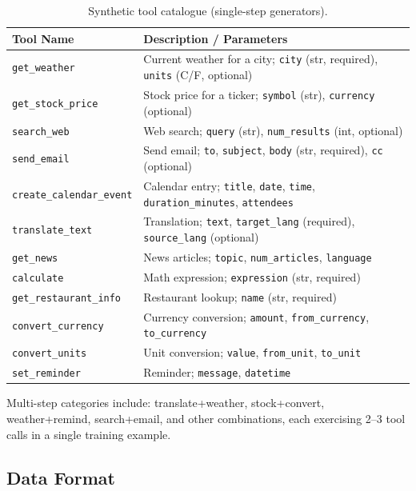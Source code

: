 \documentclass[12pt, a4paper]{article}
\newcommand{\thead}[1]{\textbf{#1}}
\begin{document}
\begin{table}[H]
\centering
\caption{Synthetic tool catalogue (single-step generators).}
\label{tab:tools}
\begin{tabularx}{\linewidth}{L{4.2cm} L{9.8cm}}
\toprule
\thead{Tool Name} & \thead{Description / Parameters} \\
\midrule
\texttt{get\_weather} & Current weather for a city; \texttt{city} (str, required), \texttt{units} (C/F, optional) \\
\texttt{get\_stock\_price} & Stock price for a ticker; \texttt{symbol} (str), \texttt{currency} (optional) \\
\texttt{search\_web} & Web search; \texttt{query} (str), \texttt{num\_results} (int, optional) \\
\texttt{send\_email} & Send email; \texttt{to}, \texttt{subject}, \texttt{body} (str, required), \texttt{cc} (optional) \\
\texttt{create\_calendar\_event} & Calendar entry; \texttt{title}, \texttt{date}, \texttt{time}, \texttt{duration\_minutes}, \texttt{attendees} \\
\texttt{translate\_text} & Translation; \texttt{text}, \texttt{target\_lang} (required), \texttt{source\_lang} (optional) \\
\texttt{get\_news} & News articles; \texttt{topic}, \texttt{num\_articles}, \texttt{language} \\
\texttt{calculate} & Math expression; \texttt{expression} (str, required) \\
\texttt{get\_restaurant\_info} & Restaurant lookup; \texttt{name} (str, required) \\
\texttt{convert\_currency} & Currency conversion; \texttt{amount}, \texttt{from\_currency}, \texttt{to\_currency} \\
\texttt{convert\_units} & Unit conversion; \texttt{value}, \texttt{from\_unit}, \texttt{to\_unit} \\
\texttt{set\_reminder} & Reminder; \texttt{message}, \texttt{datetime} \\
\bottomrule
\end{tabularx}
\end{table}

Multi-step categories include: translate+weather, stock+convert, weather+remind,
search+email, and other combinations, each exercising 2--3 tool calls in a
single training example.

\subsection{Data Format}
\end{document}
